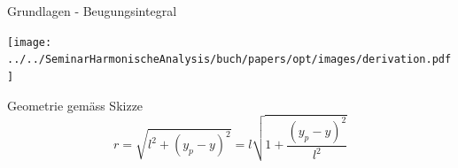 \begin{frame}{Grundlagen - Beugungsintegral}
    \begin{center}
        \texttt{[image: ../../SeminarHarmonischeAnalysis/buch/papers/opt/images/derivation.pdf]}
    \end{center}
    \begin{block}{Geometrie gemäss Skizze}
        \begin{equation*}
            r
            =
            \sqrt{l^2 + (y_p-y)^2}
            =
            l \sqrt{1 + \frac{(y_p-y)^2}{l^2}}
        \end{equation*}
    \end{block}
\end{frame}

